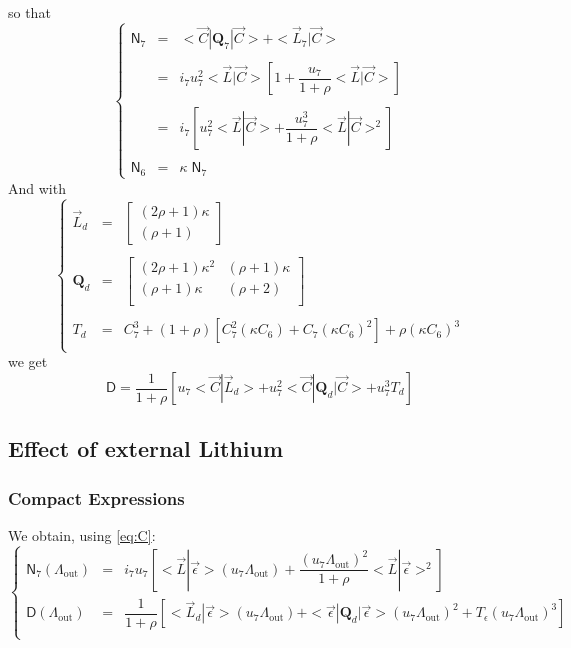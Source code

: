 \documentclass[aps,onecolumn,11pt]{revtex4}
\newcommand{\myout}[1]{{#1}_{\mathrm{out}}}
\newcommand{\mymat}[1]{{\bm{#1}}}
\newcommand{\LiAll}{\Lambda}
\newcommand{\LiAllOut}{\myout{\LiAll}}
\begin{document}
so that
\begin{equation}
\left\lbrace
\begin{array}{rcl}
\mathsf{N}_7 & = & <\vec{C}|\mymat{Q}_7|\vec{C}> + <\vec{L}_7|\vec{C}> \\
\\
 & = & i_7 u_7^2  <\vec{L}|\vec{C}> \left[ 1 + \dfrac{u_7}{1+\rho}  <\vec{L}|\vec{C}> \right]\\
 \\
 & = & i_7 \left[  u_7^2  <\vec{L}|\vec{C}> + \dfrac{u_7^3}{1+\rho} <\vec{L}|\vec{C}>^2 \right]\\
 \\
\mathsf{N}_6 & = & \kappa \; \mathsf{N}_7
\end{array} 
\right.
\end{equation}
And with
\begin{equation}
\left\lbrace
\begin{array}{rcl}
\vec{L}_d & = &
\begin{bmatrix}
(2\rho+1) \kappa\\
(\rho+1)
\end{bmatrix}\\
\\
\mymat{Q}_d & =  &
\begin{bmatrix}
(2\rho+1)\kappa^2 & (\rho+1)\kappa \\
(\rho+1) \kappa   & (\rho+2)  \\
\end{bmatrix}\\
\\
T_d & = & C_7^3 + (1+\rho)[C_7^2(\kappa C_6)+C_7(\kappa C_6)^2] + \rho (\kappa C_6)^3 \\
\end{array}
\right.
\end{equation}
we get
\begin{equation}
	\mathsf{D} = \dfrac{1}{1+\rho} \left[ u_7 <\vec{C}|\vec{L}_d> + u_7^2 <\vec{C}|\mymat{Q}_d|\vec{C}> + u_7^3 T_d \right]
\end{equation}

\subsection{Effect of external Lithium}
\subsubsection{Compact Expressions}
We obtain, using \eqref{eq:C}:
\begin{equation}
\left\lbrace
\begin{array}{rcl}
	\mathsf{N}_7(\LiAllOut) & = & i_7u_7 \left[ <\vec{L}|\vec{\epsilon}> (u_7\LiAllOut) +  \dfrac{\left(u_7\LiAllOut\right)^2}{1+\rho}  <\vec{L}|\vec{\epsilon}>^2 \right]\\
	\mathsf{D}(\LiAllOut)   & = & \dfrac{1}{1+\rho} \left[ <\vec{L}_d|\vec{\epsilon}> (u_7\LiAllOut) + <\vec{\epsilon}|\mymat{Q}_d|\vec{\epsilon}>\left(u_7\LiAllOut\right)^2 
	+  T_\epsilon \left(u_7\LiAllOut\right)^3\right]\\
\end{array}
\right.
\end{equation}
\end{document}
